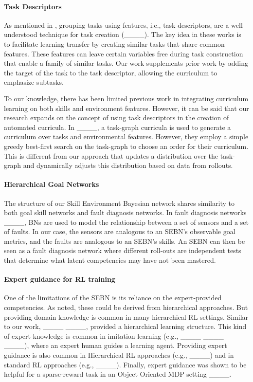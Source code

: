 \paragraph{Task Descriptors}
As mentioned in , grouping tasks using features, i.e., task descriptors, are a well understood technique for task creation (____).  The key idea in these works is to facilitate learning transfer by creating similar tasks that share common features.  These features can leave certain variables free during task construction that enable a family of similar tasks. 
Our work supplements prior work by adding the target of the task to the task descriptor, allowing the curriculum to emphasize subtasks.

To our knowledge, there has been limited previous work in integrating curriculum learning on both skills and environment features. However, it can be said that our research expands on the concept of using task descriptors in the creation of automated curricula. In ____, a task-graph curricula is used to generate a curriculum over tasks and environmental features. However, they employ a simple greedy best-first search on the task-graph to choose an order for their curriculum. This is different from our approach that updates a distribution over the task-graph and dynamically adjusts this distribution based on data from rollouts.

\paragraph{Hierarchical Goal Networks}

The structure of our Skill Environment Bayesian network shares similarity to both goal skill networks and fault diagnosis networks. In fault diagnosis networks ____, BNs are used to model the relationship between a set of sensors and a set of faults. In our case, the sensors are analogous to an SEBN's observable goal metrics, and the faults are analogous to an SEBN's skills. An SEBN can then be seen as a fault diagnosis network where different roll-outs are independent tests that determine what latent competencies may have not been mastered.




\paragraph{Expert guidance for RL training}
One of the limitations of the SEBN is its reliance on the expert-provided competencies. 
As noted, these could be derived from hierarchical approaches. 
But providing domain knowledge is common in many hierarchical RL settings.
Similar to our work,  ____ ____, provided a hierarchical learning structure.
This kind of expert knowledge is common in  imitation learning (e.g., ____ ____ ____), where an expert human guides a learning agent.
Providing expert guidance is also common in Hierarchical RL approaches (e.g., ____) and in standard RL approaches (e.g., ____).
Finally, expert guidance was shown to be helpful for a sparse-reward task in an Object Oriented MDP setting ____.


